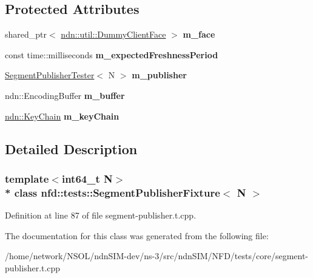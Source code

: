 \subsection*{Protected Attributes}
\begin{DoxyCompactItemize}
\item 
shared\+\_\+ptr$<$ \hyperlink{classndn_1_1util_1_1DummyClientFace}{ndn\+::util\+::\+Dummy\+Client\+Face} $>$ {\bfseries m\+\_\+face}\hypertarget{classnfd_1_1tests_1_1SegmentPublisherFixture_acb638de1f366c91283c3073cfee6b119}{}\label{classnfd_1_1tests_1_1SegmentPublisherFixture_acb638de1f366c91283c3073cfee6b119}

\item 
const time\+::milliseconds {\bfseries m\+\_\+expected\+Freshness\+Period}\hypertarget{classnfd_1_1tests_1_1SegmentPublisherFixture_a39a7072c621293b23eed6c5ab55b264a}{}\label{classnfd_1_1tests_1_1SegmentPublisherFixture_a39a7072c621293b23eed6c5ab55b264a}

\item 
\hyperlink{classnfd_1_1tests_1_1SegmentPublisherTester}{Segment\+Publisher\+Tester}$<$ N $>$ {\bfseries m\+\_\+publisher}\hypertarget{classnfd_1_1tests_1_1SegmentPublisherFixture_a2e65649fd03c505560b9ffeb8910aec7}{}\label{classnfd_1_1tests_1_1SegmentPublisherFixture_a2e65649fd03c505560b9ffeb8910aec7}

\item 
ndn\+::\+Encoding\+Buffer {\bfseries m\+\_\+buffer}\hypertarget{classnfd_1_1tests_1_1SegmentPublisherFixture_ab88ce827482cb92bc610c3a4df8f2821}{}\label{classnfd_1_1tests_1_1SegmentPublisherFixture_ab88ce827482cb92bc610c3a4df8f2821}

\item 
\hyperlink{classndn_1_1security_1_1KeyChain}{ndn\+::\+Key\+Chain} {\bfseries m\+\_\+key\+Chain}\hypertarget{classnfd_1_1tests_1_1SegmentPublisherFixture_ad6656c6798e56fa484af516bf8f34b47}{}\label{classnfd_1_1tests_1_1SegmentPublisherFixture_ad6656c6798e56fa484af516bf8f34b47}

\end{DoxyCompactItemize}


\subsection{Detailed Description}
\subsubsection*{template$<$int64\+\_\+t N$>$\\*
class nfd\+::tests\+::\+Segment\+Publisher\+Fixture$<$ N $>$}



Definition at line 87 of file segment-\/publisher.\+t.\+cpp.



The documentation for this class was generated from the following file\+:\begin{DoxyCompactItemize}
\item 
/home/network/\+N\+S\+O\+L/ndn\+S\+I\+M-\/dev/ns-\/3/src/ndn\+S\+I\+M/\+N\+F\+D/tests/core/segment-\/publisher.\+t.\+cpp\end{DoxyCompactItemize}
